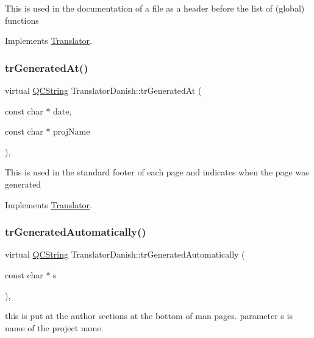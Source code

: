 This is used in the documentation of a file as a header before the list of (global) functions 

Implements \mbox{\hyperlink{class_translator}{Translator}}.

\mbox{\label{class_translator_danish_a6ffe3905541fea064f1c8f27d6a27d39}} 
\subsubsection{\texorpdfstring{trGeneratedAt()}{trGeneratedAt()}}
{\footnotesize\ttfamily virtual \mbox{\hyperlink{class_q_c_string}{Q\+C\+String}} Translator\+Danish\+::tr\+Generated\+At (\begin{DoxyParamCaption}\item[{const char $\ast$}]{date,  }\item[{const char $\ast$}]{proj\+Name }\end{DoxyParamCaption})\hspace{0.3cm}{\ttfamily [inline]}, {\ttfamily [virtual]}}

This is used in the standard footer of each page and indicates when the page was generated 

Implements \mbox{\hyperlink{class_translator}{Translator}}.

\mbox{\label{class_translator_danish_a0eaa302a426018ba4cc9476af9bc8ad2}} 
\subsubsection{\texorpdfstring{trGeneratedAutomatically()}{trGeneratedAutomatically()}}
{\footnotesize\ttfamily virtual \mbox{\hyperlink{class_q_c_string}{Q\+C\+String}} Translator\+Danish\+::tr\+Generated\+Automatically (\begin{DoxyParamCaption}\item[{const char $\ast$}]{s }\end{DoxyParamCaption})\hspace{0.3cm}{\ttfamily [inline]}, {\ttfamily [virtual]}}

this is put at the author sections at the bottom of man pages. parameter s is name of the project name. 

